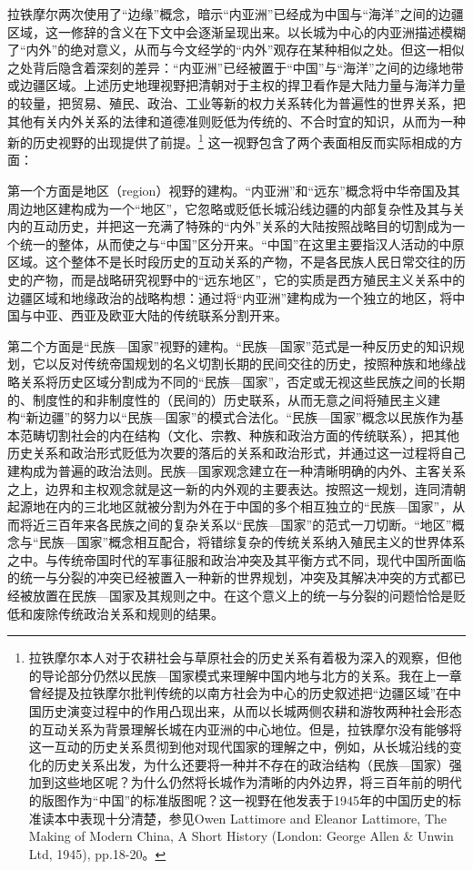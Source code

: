 \documentclass[a4paper, 12pt, openright]{ctexbook}
\begin{document}
拉铁摩尔两次使用了“边缘”概念，暗示“内亚洲”已经成为中国与“海洋”之间的边疆区域，这一修辞的含义在下文中会逐渐呈现出来。以长城为中心的内亚洲描述模糊了“内外”的绝对意义，从而与今文经学的“内外”观存在某种相似之处。但这一相似之处背后隐含着深刻的差异：“内亚洲”已经被置于“中国”与“海洋”之间的边缘地带或边疆区域。上述历史地理视野把清朝对于主权的捍卫看作是大陆力量与海洋力量的较量，把贸易、殖民、政治、工业等新的权力关系转化为普遍性的世界关系，把其他有关内外关系的法律和道德准则贬低为传统的、不合时宜的知识，从而为一种新的历史视野的出现提供了前提。\footnote{拉铁摩尔本人对于农耕社会与草原社会的历史关系有着极为深入的观察，但他的导论部分仍然以民族—国家模式来理解中国内地与北方的关系。我在上一章曾经提及拉铁摩尔批判传统的以南方社会为中心的历史叙述把“边疆区域”在中国历史演变过程中的作用凸现出来，从而以长城两侧农耕和游牧两种社会形态的互动关系为背景理解长城在内亚洲的中心地位。但是，拉铁摩尔没有能够将这一互动的历史关系贯彻到他对现代国家的理解之中，例如，从长城沿线的变化的历史关系出发，为什么还要将一种并不存在的政治结构（民族—国家）强加到这些地区呢？为什么仍然将长城作为清晰的内外边界，将三百年前的明代的版图作为“中国”的标准版图呢？这一视野在他发表于1945年的中国历史的标准读本中表现十分清楚，参见Owen Lattimore and Eleanor Lattimore, The Making of Modern China, A Short History (London: George Allen \& Unwin Ltd, 1945), pp.18-20。} 这一视野包含了两个表面相反而实际相成的方面：

第一个方面是地区（region）视野的建构。“内亚洲”和“远东”概念将中华帝国及其周边地区建构成为一个“地区”，它忽略或贬低长城沿线边疆的内部复杂性及其与关内的互动历史，并把这一充满了特殊的“内外”关系的大陆按照战略目的切割成为一个统一的整体，从而使之与“中国”区分开来。“中国”在这里主要指汉人活动的中原区域。这个整体不是长时段历史的互动关系的产物，不是各民族人民日常交往的历史的产物，而是战略研究视野中的“远东地区”，它的实质是西方殖民主义关系中的边疆区域和地缘政治的战略构想：通过将“内亚洲”建构成为一个独立的地区，将中国与中亚、西亚及欧亚大陆的传统联系分割开来。

第二个方面是“民族—国家”视野的建构。“民族—国家”范式是一种反历史的知识规划，它以反对传统帝国规划的名义切割长期的民间交往的历史，按照种族和地缘战略关系将历史区域分割成为不同的“民族—国家”，否定或无视这些民族之间的长期的、制度性的和非制度性的（民间的）历史联系，从而无意之间将殖民主义建构“新边疆”的努力以“民族—国家”的模式合法化。“民族—国家”概念以民族作为基本范畴切割社会的内在结构（文化、宗教、种族和政治方面的传统联系），把其他历史关系和政治形式贬低为次要的落后的关系和政治形式，并通过这一过程将自己建构成为普遍的政治法则。民族—国家观念建立在一种清晰明确的内外、主客关系之上，边界和主权观念就是这一新的内外观的主要表达。按照这一规划，连同清朝起源地在内的三北地区就被分割为外在于中国的多个相互独立的“民族—国家”，从而将近三百年来各民族之间的复杂关系以“民族—国家”的范式一刀切断。“地区”概念与“民族—国家”概念相互配合，将错综复杂的传统关系纳入殖民主义的世界体系之中。与传统帝国时代的军事征服和政治冲突及其平衡方式不同，现代中国所面临的统一与分裂的冲突已经被置入一种新的世界规划，冲突及其解决冲突的方式都已经被放置在民族—国家及其规则之中。在这个意义上的统一与分裂的问题恰恰是贬低和废除传统政治关系和规则的结果。
\end{document}
